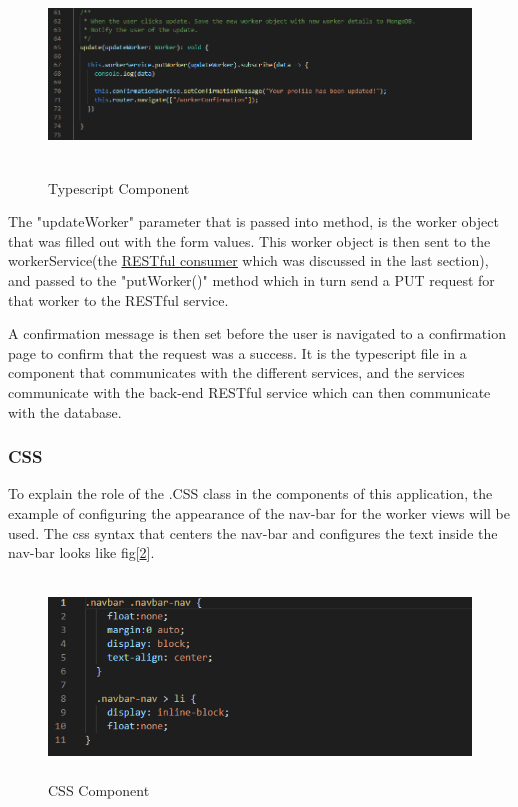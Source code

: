 \begin{figure}[H]
    \centering
    \includegraphics[width=\textwidth, height=150pt]{DesignImages/edit-profileLogic.PNG}
    \caption{Typescript Component}
    \label{fig:tsComponent}
\end{figure}

\bigskip

The "updateWorker" parameter that is passed into method, is the worker object that was filled out with the form values. This worker object is then sent to the workerService(the \hyperref[sec:SystemDesignRESTConsumers]{\underline{RESTful consumer}} which was discussed in the last section), and passed to the "putWorker()" method which in turn send a PUT request for that worker to the RESTful service. 

A confirmation message is then set before the user is navigated to a confirmation page to confirm that the request was a success. It is the typescript file in a component that communicates with the different services, and the services communicate with the back-end RESTful service which can then communicate with the database.

\subsubsection{CSS}
\label{sec:SystemDesignCSS}

To explain the role of the .CSS class in the components of this application, the example of configuring the appearance of the nav-bar for the worker views will be used. The css syntax that centers the nav-bar and configures the text inside the nav-bar looks like fig[\ref{fig:css}].

\begin{figure}[H]
    \centering
    \includegraphics[width=\textwidth, height=150pt]{DesignImages/edit-profileStyle.PNG}
    \caption{CSS Component}
    \label{fig:css}
\end{figure}

